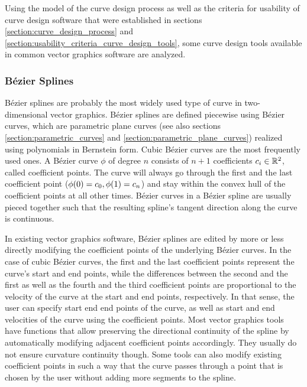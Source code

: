 \documentclass[a4paper]{article}
\begin{document}
			Using the model of the curve design process as well as the criteria for usability of curve design software that were established in sections \ref{section:curve_design_process} and \ref{section:usability_criteria_curve_design_tools}, some curve design tools available in common vector graphics software are analyzed.

			\subsubsection{Bézier Splines}
			\label{section:bézier_splines}

				Bézier splines are probably the most widely used type of curve in two-dimensional vector graphics. Bézier splines are defined piecewise using Bézier curves, which are parametric plane curves (see also sections \ref{section:parametric_curves} and \ref{section:parametric_plane_curves}) realized using polynomials in Bernstein form. Cubic Bézier curves are the most frequently used ones. A Bézier curve \(\phi\) of degree \(n\) consists of \(n + 1\) coefficients \(c_i \in \mathbb{R}^{2}\), called coefficient points. The curve will always go through the first and the last coefficient point (\(\phi\!\left( 0 \right) = c_0, \phi\!\left( 1 \right) = c_n\)) and stay within the convex hull of the coefficient points at all other times. Bézier curves in a Bézier spline are usually pieced together such that the resulting spline's tangent direction along the curve is continuous.

				In existing vector graphics software, Bézier splines are edited by more or less directly modifying the coefficient points of the underlying Bézier curves. In the case of cubic Bézier curves, the first and the last coefficient points represent the curve's start and end points, while the differences between the second and the first as well as the fourth and the third coefficient points are proportional to the velocity of the curve at the start and end points, respectively. In that sense, the user can specify start end end points of the curve, as well as start and end velocities of the curve using the coefficient points. Most vector graphics tools have functions that allow preserving the directional continuity of the spline by automatically modifying adjacent coefficient points accordingly. They usually do not ensure curvature continuity though. Some tools can also modify existing coefficient points in such a way that the curve passes through a point that is chosen by the user without adding more segments to the spline.
\end{document}
